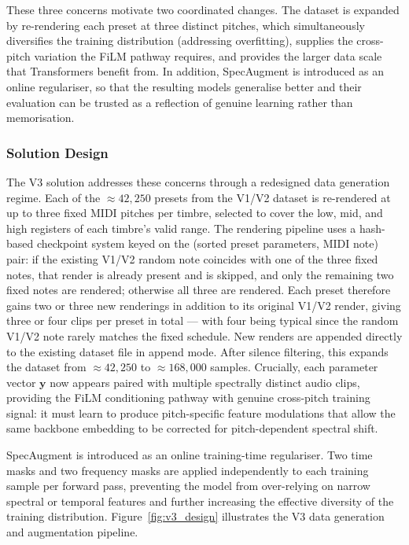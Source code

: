 \noindent \newline
These three concerns motivate two coordinated changes. The dataset is expanded by re-rendering each preset at three distinct pitches, which simultaneously diversifies the training distribution (addressing overfitting), supplies the cross-pitch variation the FiLM pathway requires, and provides the larger data scale that Transformers benefit from. In addition, SpecAugment is introduced as an online regulariser, so that the resulting models generalise better and their evaluation can be trusted as a reflection of genuine learning rather than memorisation.

\subsubsection{Solution Design}

\noindent
The V3 solution addresses these concerns through a redesigned data generation regime. Each of the $\approx 42{,}250$ presets from the V1/V2 dataset is re-rendered at up to three fixed MIDI pitches per timbre, selected to cover the low, mid, and high registers of each timbre's valid range. The rendering pipeline uses a hash-based checkpoint system keyed on the (sorted preset parameters, MIDI note) pair: if the existing V1/V2 random note coincides with one of the three fixed notes, that render is already present and is skipped, and only the remaining two fixed notes are rendered; otherwise all three are rendered. Each preset therefore gains two or three new renderings in addition to its original V1/V2 render, giving three or four clips per preset in total — with four being typical since the random V1/V2 note rarely matches the fixed schedule. New renders are appended directly to the existing dataset file in append mode. After silence filtering, this expands the dataset from $\approx 42{,}250$ to $\approx 168{,}000$ samples. Crucially, each parameter vector $\mathbf{y}$ now appears paired with multiple spectrally distinct audio clips, providing the FiLM conditioning pathway with genuine cross-pitch training signal: it must learn to produce pitch-specific feature modulations that allow the same backbone embedding to be corrected for pitch-dependent spectral shift.

\noindent \newline
SpecAugment \cite{park2019specaugment} is introduced as an online training-time regulariser. Two time masks and two frequency masks are applied independently to each training sample per forward pass, preventing the model from over-relying on narrow spectral or temporal features and further increasing the effective diversity of the training distribution. Figure~\ref{fig:v3_design} illustrates the V3 data generation and augmentation pipeline.

